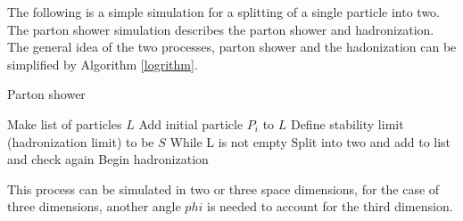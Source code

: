 The following is a simple simulation for a splitting of a single particle into two. The parton shower simulation describes the parton shower and hadronization. The general idea of the two processes, parton shower and the hadonization can be simplified by Algorithm \ref{logrithm}.
\begin{algorithm}
\caption{Parton shower}\label{logrithm}
\begin{algorithmic}
\State Make list of particles $L$ 
\State Add initial particle $P_{i}$ to $L$
\State Define stability limit (hadronization limit) to be $S$  
\State While L is not empty
	\State Split into two and add to list and check again 
\Else 
	\State Begin hadronization  
\EndIf
\end{algorithmic}
\end{algorithm}

This process can be simulated in two or three space dimensions, for the case of three dimensions, another angle $phi$ is needed to account for the third dimension.

%
%
%
%
%
%
%
%
%
%
%
